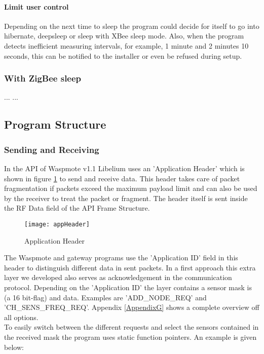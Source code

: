 \paragraph{Limit user control}
Depending on the next time to sleep the program could decide for itself to go into hibernate, deepsleep or sleep with XBee sleep mode. Also, when the program detects inefficient measuring intervals, for example, 1 minute and 2 minutes 10 seconds, this can be notified to the installer or even be refused during setup.
\subsubsection{With ZigBee sleep}
... ...
\subsection{Program Structure}
\subsubsection{Sending and Receiving}
In the API of Waspmote v1.1 Libelium uses an 'Application Header' which is shown in figure \ref{fig:appH} to send and receive data. This header takes care of packet fragmentation if packets exceed the maximum payload limit and can also be used by the receiver to treat the packet or fragment. The header itself is sent inside the RF Data field of the API Frame Structure.\\
\begin{figure}[ht]
\centering
\texttt{[image: appHeader]}
\caption{Application Header}
\label{fig:appH}
\end{figure}
The Waspmote and gateway programs use the 'Application ID' field in this header to distinguish different data in sent packets. In a first approach this extra layer we developed also serves as acknowledgement in the communication protocol. Depending on the 'Application ID' the layer contains a sensor mask is (a 16 bit-flag) and data. Examples are 'ADD\_NODE\_REQ' and 'CH\_SENS\_FREQ\_REQ'. Appendix \ref{AppendixG} shows a complete overview off all options.\\
To easily switch between the different requests and select the sensors contained in the received mask the program uses static function pointers. An example is given below:

